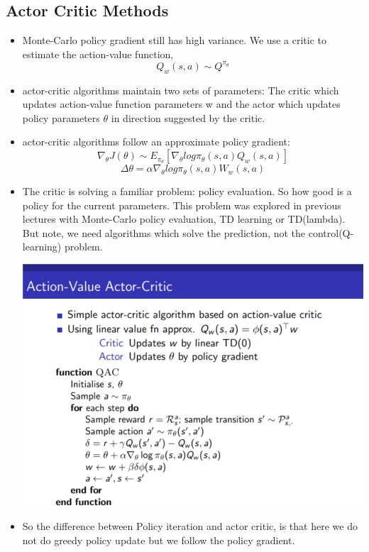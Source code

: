 \documentclass[a4paper]{article}
\begin{document}
\subsection{Actor Critic Methods}
\begin{itemize}
    \item Monte-Carlo policy gradient still has high variance. We use a critic to estimate the action-value function, $$Q_w(s,a) \sim Q^{\pi_{\theta}}$$
    \item actor-critic algorithms maintain two sets of parameters: The critic which updates action-value function parameters w and the actor which updates policy parameters $\theta$ in direction suggested by the critic. 
    \item actor-critic algorithms follow an approximate policy gradient: $$\nabla_{\theta} J(\theta) \sim E_{\pi_{\theta}}[\nabla_{\theta}log \pi_{\theta}(s,a) Q_w(s,a)]$$
    $$\Delta \theta = \alpha \nabla_{\theta} log \pi_{\theta}(s,a) W_w(s,a)$$
    \item The critic is solving a familiar problem: policy evaluation. So how good is a policy for the current parameters. This problem was explored in previous lectures with Monte-Carlo policy evaluation, TD learning or TD(lambda). But note, we need algorithms which solve the prediction, not the control(Q-learning) problem. 
      \begin{center}
    \includegraphics[width = \textwidth]{images/actorcritic.png}
    \end{center}
    \item So the difference between Policy iteration and actor critic, is that here we do not do greedy policy update but we follow the policy gradient.

\end{itemize}
\end{document}
